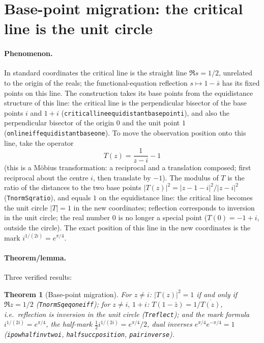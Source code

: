 \documentclass{article}
\renewcommand{\_}{\underscoreOrig\allowbreak}
\newtheorem{theorem}{Theorem}[section]
\begin{document}
\section{Base-point migration: the critical line is the unit circle}
\label{sec:migration}

\paragraph{Phenomenon.} In standard coordinates the critical line is the
straight line $\Re s=1/2$, unrelated to the origin of the reals; the
functional-equation reflection $s\mapsto1-\bar s$ has its fixed points on
this line. The construction takes its base points from the equidistance
structure of this line: the critical line is the perpendicular bisector
of the base points $i$ and $1+i$
(\texttt{critical\_line\_equidistant\_basepoint\_i}), and also the
perpendicular bisector of the origin $0$ and the unit point $1$
(\texttt{on\_line\_iff\_equidistant\_base\_one}). To move the observation
position onto this line, take the operator
\[
  T(z)=\frac{1}{z-i}-1
\]
(this is a M\"obius transformation: a reciprocal and a translation
composed; first reciprocal about the centre $i$, then translate by $-1$).
The modulus of $T$ is the ratio of the distances to the two base points
$|T(z)|^2=|z-1-i|^2/|z-i|^2$ (\texttt{T\_normSq\_ratio}), and equals $1$
on the equidistance line: the critical line becomes the unit circle
$|T|=1$ in the new coordinates; reflection corresponds to inversion in
the unit circle; the real number $0$ is no longer a special point
($T(0)=-1+i$, outside the circle). The exact position of this line in the
new coordinates is the mark $i^{1/(2i)}=e^{\pi/4}$.

\paragraph{Theorem/lemma.} Three verified results:
\begin{theorem}[Base-point migration]
\label{thm:migration}
For $z\ne i$: $|T(z)|^2=1$ if and only if $\Re z=1/2$
(\texttt{T\_normSq\_eq\_one\_iff}); for $z\ne i,\,1+i$:
$T(1-\bar z)=1/\overline{T(z)}$, i.e.\ reflection is inversion in the
unit circle (\texttt{T\_reflect}); and the mark formula
$i^{1/(2i)}=e^{\pi/4}$, the half-mark
$\frac12 i^{1/(2i)}=e^{\pi/4}/2$, dual inverses
$e^{\pi/4}e^{-\pi/4}=1$ (\texttt{i\_pow\_half\_inv\_two\_i},
\texttt{half\_succ\_position}, \texttt{pair\_inverse}).
\end{theorem}
\end{document}
